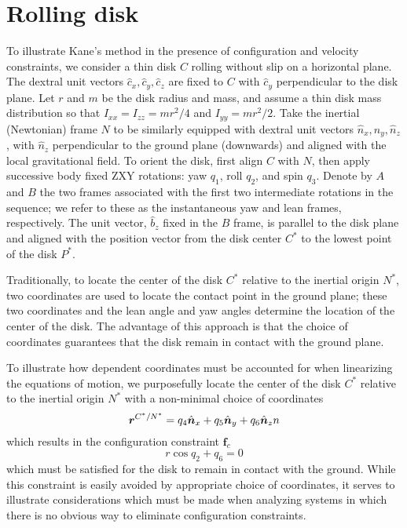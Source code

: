 \section{Rolling disk}
\label{sec:example}
To illustrate Kane's method in the presence of configuration and velocity
constraints, we consider a thin disk $C$ rolling without slip on a horizontal
plane. The dextral unit vectors $\hat{c}_x, \hat{c}_y, \hat{c}_z$ are fixed to $C$
with $\hat{c}_y$ perpendicular to the disk plane. Let $r$ and $m$ be the
disk radius and mass, and assume a thin disk mass distribution so that
$I_{xx}=I_{zz}=mr^2/4$ and $I_{yy} = mr^2/2$. Take the inertial (Newtonian)
frame $N$ to be similarly equipped with dextral unit vectors $\hat{n}_x,
\hat{n}_y, \hat{n}_z$, with $\hat{n}_z$ perpendicular to the ground plane
(downwards) and aligned with the local gravitational field. To orient the disk,
first align $C$ with $N$, then apply successive body fixed ZXY rotations:
yaw $q_1$, roll $q_2$, and spin $q_3$.  Denote by $A$ and $B$ the two frames
associated with the first two intermediate rotations in the sequence; we refer
to these as the instantaneous yaw and lean frames, respectively. The unit
vector, $\hat{b}_z$ fixed in the $B$ frame, is parallel to the disk plane and
aligned with the position vector from the disk center $C^*$ to the lowest point
of the disk $P^*$.

Traditionally, to locate the center of the disk $C^*$
relative to the inertial origin $N^*$, two coordinates are used to locate the
contact point in the ground plane; these two coordinates and the lean angle
and yaw angles determine the location of the center of the disk. The advantage of this
approach is that the choice of coordinates guarantees that the disk remain in
contact with the ground plane.

To illustrate how dependent coordinates must be
accounted for when linearizing the equations of motion, we purposefully locate
the center of the disk $C^*$ relative to the inertial origin $N^*$ with a
non-minimal choice of coordinates
\begin{equation*}
  \boldsymbol{r}^{C^*/N^*} = q_4 \hat{\boldsymbol{n}}_{x} + q_5 \hat{\boldsymbol{n}}_{y} + q_6 \hat{\boldsymbol{n}}_{z}{n}
\end{equation*}
which results in the configuration constraint $\mathbf{f}_c$
\begin{equation}
  \label{rd:f_c}
  r\cos{q_2} + q_6 = 0
\end{equation}
which must be satisfied for the disk to remain in contact with the ground.
While this constraint is easily avoided by appropriate choice of coordinates,
it serves to illustrate considerations which must be made when analyzing
systems in which there is no obvious way to eliminate configuration constraints.

